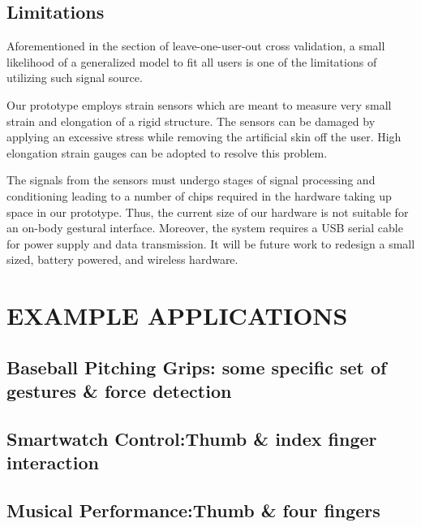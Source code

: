 \documentclass{sigchi}
\begin{document}
\subsection{Limitations}
Aforementioned in the section of leave-one-user-out cross validation, a small likelihood of a generalized model to fit all users is one of the limitations of utilizing such signal source.

Our prototype employs strain sensors which are meant to measure very small strain and elongation of a rigid structure. The sensors can be damaged by applying an excessive stress while removing the artificial skin off the user. High elongation strain gauges can be adopted to resolve this problem.

The signals from the sensors must undergo stages of signal processing and conditioning leading to a number of chips required in the hardware taking up space in our prototype. Thus, the current size of our hardware is not suitable for an on-body gestural interface. Moreover, the system requires a USB serial cable for power supply and data transmission. It will be future work to redesign a small sized, battery powered, and wireless hardware.

\section{EXAMPLE APPLICATIONS}

\subsection{Baseball Pitching Grips: some specific set of gestures \& force detection}

\subsection{Smartwatch Control:Thumb \& index finger interaction}
    
\subsection{Musical Performance:Thumb \& four fingers}
    

    
\end{document}
